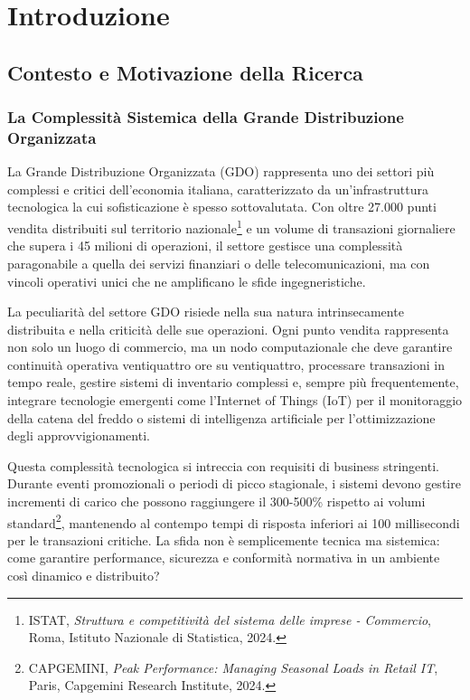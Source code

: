
\chapter{Introduzione}

\section{Contesto e Motivazione della Ricerca}

\subsection{La Complessità Sistemica della Grande Distribuzione Organizzata}

La Grande Distribuzione Organizzata (GDO) rappresenta uno dei settori più complessi e critici dell'economia italiana, caratterizzato da un'infrastruttura tecnologica la cui sofisticazione è spesso sottovalutata. Con oltre 27.000 punti vendita distribuiti sul territorio nazionale\footnote{ISTAT, \textit{Struttura e competitività del sistema delle imprese - Commercio}, Roma, Istituto Nazionale di Statistica, 2024.} e un volume di transazioni giornaliere che supera i 45 milioni di operazioni, il settore gestisce una complessità paragonabile a quella dei servizi finanziari o delle telecomunicazioni, ma con vincoli operativi unici che ne amplificano le sfide ingegneristiche.

La peculiarità del settore GDO risiede nella sua natura intrinsecamente distribuita e nella criticità delle sue operazioni. Ogni punto vendita rappresenta non solo un luogo di commercio, ma un nodo computazionale che deve garantire continuità operativa ventiquattro ore su ventiquattro, processare transazioni in tempo reale, gestire sistemi di inventario complessi e, sempre più frequentemente, integrare tecnologie emergenti come l'Internet of Things (IoT) per il monitoraggio della catena del freddo o sistemi di intelligenza artificiale per l'ottimizzazione degli approvvigionamenti.

Questa complessità tecnologica si intreccia con requisiti di business stringenti. Durante eventi promozionali o periodi di picco stagionale, i sistemi devono gestire incrementi di carico che possono raggiungere il 300-500\% rispetto ai volumi standard\footnote{CAPGEMINI, \textit{Peak Performance: Managing Seasonal Loads in Retail IT}, Paris, Capgemini Research Institute, 2024.}, mantenendo al contempo tempi di risposta inferiori ai 100 millisecondi per le transazioni critiche. La sfida non è semplicemente tecnica ma sistemica: come garantire performance, sicurezza e conformità normativa in un ambiente così dinamico e distribuito?

